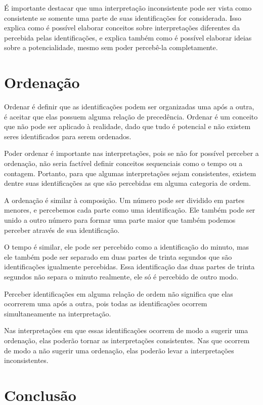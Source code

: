 \documentclass[11pt]{article}
\begin{document}
	É importante destacar que uma interpretação inconsistente pode ser vista como consistente se somente uma parte de suas identificações for considerada. Isso explica como é possível elaborar conceitos sobre interpretações diferentes da percebida pelas identificações, e explica também como é possível elaborar ideias sobre a potencialidade, mesmo sem poder percebê-la completamente.

	\section{Ordenação} \label{pt-s6}
	
	Ordenar é definir que as identificações podem ser organizadas uma após a outra, é aceitar que elas possuem alguma relação de precedência. Ordenar é um conceito que não pode ser aplicado à realidade, dado que tudo é potencial e não existem seres identificados para serem ordenados.
	
	Poder ordenar é importante nas interpretações, pois se não for possível perceber a ordenação, não seria factível definir conceitos sequenciais como o tempo ou a contagem. Portanto, para que algumas interpretações sejam consistentes, existem dentre suas identificações as que são percebidas em alguma categoria de ordem.
	
	A ordenação é similar à composição. Um número pode ser dividido em partes menores, e percebemos cada parte como uma identificação. Ele também pode ser unido a outro número para formar uma parte maior que também podemos perceber através de sua identificação. 
	
	O tempo é similar, ele pode ser percebido como a identificação do minuto, mas ele também pode ser separado em duas partes de trinta segundos que são identificações igualmente percebidas. Essa identificação das duas partes de trinta segundos não separa o minuto realmente, ele só é percebido de outro modo.
	
	Perceber identificações em alguma relação de ordem não significa que elas ocorrerem uma após a outra, pois todas as identificações ocorrem simultaneamente na interpretação. 
	
	Nas interpretações em que essas identificações ocorrem de modo a sugerir uma ordenação, elas poderão tornar as interpretações consistentes. Nas que ocorrem de modo a não sugerir uma ordenação, elas poderão levar a interpretações inconsistentes.

	\section{Conclusão} \label{pt-s7}
	
\end{document}
